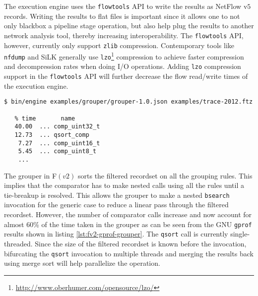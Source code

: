 The execution engine uses the \texttt{flowtools} API to write the results as
NetFlow v$5$ records. Writing the results to flat files is important since it
allows one to not only blackbox a pipeline stage operation, but also help plug
the results to another network analysis tool, thereby increasing
interoperability. The \texttt{flowtools}
API, however, currently only support \texttt{zlib} compression. Contemporary
tools like \texttt{nfdump} and SiLK generally use
\texttt{lzo}\footnote{\url{http://www.oberhumer.com/opensource/lzo/}}
compression to achieve faster compression and decompression rates when doing
I/O operations.  Adding \texttt{lzo} compression support in the
\texttt{flowtools} API will further decrease the flow read/write times of the
execution engine.




\begin{lstlisting}
$ bin/engine examples/grouper/grouper-1.0.json examples/trace-2012.ftz

   % time   	name
   40.00  ... comp_uint32_t
   12.73  ... qsort_comp
    7.27  ... comp_uint16_t
    5.45  ... comp_uint8_t
    ...
\end{lstlisting}

The grouper in F$(v2)$ sorts the filtered recordset on all the grouping rules.
This implies that the comparator has to make nested calls using all the rules
until a  tie-breakup is resolved. This
allows the grouper to make a nested \texttt{bsearch} invocation for the
generic case to reduce a linear pass through the filtered recordset.  However,
the number of comparator calls increase and now account for almost $60\%$ of
the time taken in the grouper as can be seen from the GNU \texttt{gprof}
results shown in listing \ref{lst:fv2-gprof-grouper}. The \texttt{qsort} call
is currently single-threaded. Since the size of the filtered recordset is
known before the invocation, bifurcating the \texttt{qsort} invocation to
multiple threads and merging the results back using merge sort will help
parallelize the operation.





